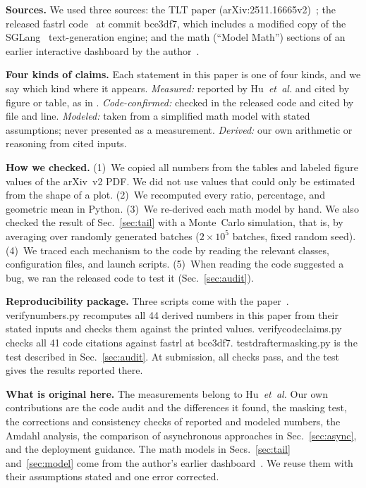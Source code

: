 \documentclass[conference]{IEEEtran}
\newcommand{\brkus}{\textunderscore\allowbreak}
\newcommand{\code}[1]{{\small\ttfamily\let\_\brkus\hyphenchar\font=-1 #1}}
\begin{document}
\textbf{Sources.} We used three sources: the TLT paper (arXiv:2511.16665v2)~\cite{hu2026tlt}; the released \code{fastrl} code~\cite{fastrl} at commit \code{bce3df7}, which includes a modified copy of the SGLang~\cite{zheng2024sglang} text-generation engine; and the math (``Model Math'') sections of an earlier interactive dashboard by the author~\cite{hibbs2026dashboard}.

\textbf{Four kinds of claims.} Each statement in this paper is one of four kinds, and we say which kind where it appears.
\emph{Measured:} reported by Hu~\emph{et~al.} and cited by figure or table, as in \cite[Fig./Table]{hu2026tlt}.
\emph{Code-confirmed:} checked in the released code and cited by file and line.
\emph{Modeled:} taken from a simplified math model with stated assumptions; never presented as a measurement.
\emph{Derived:} our own arithmetic or reasoning from cited inputs.

\textbf{How we checked.} (1)~We copied all numbers from the tables and labeled figure values of the arXiv~v2 PDF. We did not use values that could only be estimated from the shape of a plot. (2)~We recomputed every ratio, percentage, and geometric mean in Python. (3)~We re-derived each math model by hand. We also checked the result of Sec.~\ref{sec:tail} with a Monte~Carlo simulation, that is, by averaging over randomly generated batches ($2\times10^5$ batches, fixed random seed). (4)~We traced each mechanism to the code by reading the relevant classes, configuration files, and launch scripts. (5)~When reading the code suggested a bug, we ran the released code to test it (Sec.~\ref{sec:audit}).

\textbf{Reproducibility package.} Three scripts come with the paper~\cite{hibbs2026artifact}. \code{verify\_numbers.py} recomputes all 44 derived numbers in this paper from their stated inputs and checks them against the printed values. \code{verify\_code\_claims.py} checks all 41 code citations against \code{fastrl} at \code{bce3df7}. \code{test\_drafter\_masking.py} is the test described in Sec.~\ref{sec:audit}. At submission, all checks pass, and the test gives the results reported there.

\textbf{What is original here.} The measurements belong to Hu~\emph{et~al.} Our own contributions are the code audit and the differences it found, the masking test, the corrections and consistency checks of reported and modeled numbers, the Amdahl analysis, the comparison of asynchronous approaches in Sec.~\ref{sec:async}, and the deployment guidance. The math models in Secs.~\ref{sec:tail} and~\ref{sec:model} come from the author's earlier dashboard~\cite{hibbs2026dashboard}. We reuse them with their assumptions stated and one error corrected.
\end{document}
